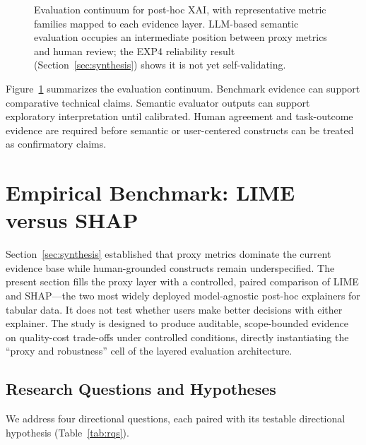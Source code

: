 \documentclass[twoside,11pt]{article}
\begin{document}
\begin{figure}[t]
\caption{Evaluation continuum for post-hoc XAI, with representative metric
families mapped to each evidence layer. LLM-based semantic evaluation
occupies an intermediate position between proxy metrics and human
review; the EXP4 reliability result (Section~\ref{sec:synthesis})
shows it is not yet self-validating.}
\label{fig:continuum}
\end{figure}

Figure~\ref{fig:continuum} summarizes the evaluation continuum. Benchmark
evidence can support comparative technical claims. Semantic evaluator
outputs can support exploratory interpretation until calibrated. Human
agreement and task-outcome evidence are required before semantic or
user-centered constructs can be treated as confirmatory claims.

\section{Empirical Benchmark: LIME versus SHAP}
\label{sec:empirical}

Section~\ref{sec:synthesis} established that proxy metrics dominate the
current evidence base while human-grounded constructs remain underspecified.
The present section fills the proxy layer with a controlled, paired
comparison of LIME and SHAP---the two most widely deployed
model-agnostic post-hoc explainers for tabular data. It does not test
whether users make better decisions with either explainer. The study is
designed to produce auditable, scope-bounded evidence on quality-cost
trade-offs under controlled conditions, directly instantiating the
``proxy and robustness'' cell of the layered evaluation architecture.

\subsection{Research Questions and Hypotheses}
\label{sec:rqs}

We address four directional questions, each paired with its testable
directional hypothesis (Table~\ref{tab:rqs}).
\end{document}

